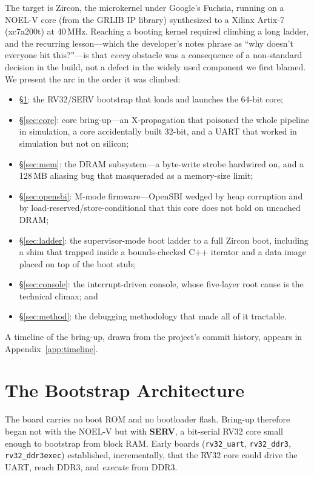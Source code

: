 \documentclass[conference,nofonttune]{IEEEtran}
\newcommand{\code}[1]{\texttt{#1}}
\begin{document}
The target is Zircon, the microkernel under Google's Fuchsia, running on a
NOEL-V core (from the GRLIB IP library) synthesized to a Xilinx Artix-7
(xc7a200t) at 40\,MHz. Reaching a booting kernel required climbing a long ladder,
and the recurring lesson---which the developer's notes phrase as ``why doesn't
everyone hit this?''---is that \emph{every} obstacle was a consequence of a
non-standard decision in the build, not a defect in the widely used component we
first blamed. We present the arc in the order it was climbed:

\begin{itemize}
  \item \S\ref{sec:bootstrap}: the RV32/SERV bootstrap that loads and launches the 64-bit core;
  \item \S\ref{sec:core}: core bring-up---an X-propagation that poisoned the whole pipeline in simulation, a core accidentally built 32-bit, and a UART that worked in simulation but not on silicon;
  \item \S\ref{sec:mem}: the DRAM subsystem---a byte-write strobe hardwired on, and a 128\,MB aliasing bug that masqueraded as a memory-size limit;
  \item \S\ref{sec:opensbi}: M-mode firmware---OpenSBI wedged by heap corruption and by load-reserved/store-conditional that this core does not hold on uncached DRAM;
  \item \S\ref{sec:ladder}: the supervisor-mode boot ladder to a full Zircon boot, including a shim that trapped inside a bounds-checked C++ iterator and a data image placed on top of the boot stub;
  \item \S\ref{sec:console}: the interrupt-driven console, whose five-layer root cause is the technical climax; and
  \item \S\ref{sec:method}: the debugging methodology that made all of it tractable.
\end{itemize}

A timeline of the bring-up, drawn from the project's commit history, appears in
Appendix~\ref{app:timeline}.

\section{The Bootstrap Architecture}
\label{sec:bootstrap}

The board carries no boot ROM and no bootloader flash. Bring-up therefore began
not with the NOEL-V but with \textbf{SERV}, a bit-serial RV32 core small enough
to bootstrap from block RAM. Early boards (\code{rv32\_uart},
\code{rv32\_ddr3}, \code{rv32\_ddr3exec}) established, incrementally, that the
RV32 core could drive the UART, reach DDR3, and \emph{execute} from DDR3.
\end{document}
